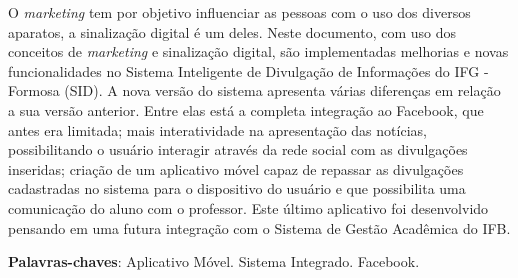 \begin{resumo}
O \textit{marketing} tem por objetivo influenciar as pessoas com o uso dos diversos aparatos, a sinalização digital é um deles. Neste documento, com uso dos conceitos de \textit{marketing} e sinalização digital, são implementadas melhorias e novas funcionalidades no Sistema Inteligente de Divulgação de Informações do IFG - Formosa (SID). A nova versão do sistema apresenta várias diferenças em relação a sua versão anterior. Entre elas está a completa integração ao Facebook, que antes era limitada; mais interatividade na apresentação das notícias, possibilitando o usuário interagir através da rede social com as divulgações inseridas; criação de um aplicativo móvel capaz de repassar as divulgações cadastradas no sistema para o dispositivo do usuário e que possibilita uma comunicação do aluno com o professor. Este último aplicativo foi desenvolvido pensando em uma futura integração com o Sistema de Gestão Acadêmica do IFB.







\vspace{3cm}
\noindent
\textbf{Palavras-chaves}: Aplicativo Móvel. Sistema Integrado. Facebook.
\end{resumo}
